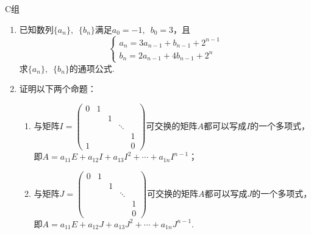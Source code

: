 \centerline{\heiti C组}
\begin{enumerate}
    \item 已知数列$\{a_n\},\enspace\{b_n\}$满足$a_0=-1,\enspace b_0=3$，且
    \[\begin{cases}
            a_n=3a_{n-1}+b_{n-1}+2^{n-1} \\
            b_n=2a_{n-1}+4b_{n-1}+2^n
        \end{cases}\]
    求$\{a_n\},\enspace\{b_n\}$的通项公式.

    \item 证明以下两个命题：
          \begin{enumerate}
              \item 与矩阵$I=\begin{pmatrix}
                            0 & 1 &   &        &   \\
                              &   & 1 &        &   \\
                              &   &   & \ddots &   \\
                              &   &   &        & 1 \\
                            1 &   &   &        & 0
                        \end{pmatrix}$可交换的矩阵$A$都可以写成$I$的一个多项式，即$A=a_{11}E+a_{12}I+a_{13}I^2+\cdots+a_{1n}I^{n-1}$；

              \item 与矩阵$J=\begin{pmatrix}
                            0 & 1 &   &        &   \\
                              &   & 1 &        &   \\
                              &   &   & \ddots &   \\
                              &   &   &        & 1 \\
                              &   &   &        & 0
                        \end{pmatrix}$可交换的矩阵$A$都可以写成$J$的一个多项式，即$A=a_{11}E+a_{12}J+a_{13}J^2+\cdots+a_{1n}J^{n-1}$.
          \end{enumerate}
\end{enumerate}
